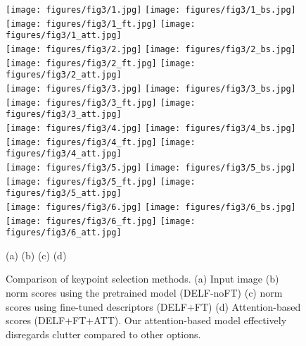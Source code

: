 \documentclass[10pt,twocolumn,letterpaper]{article}
\begin{document}
\begin{figure}[!h]
\vspace{0.1cm}
\begin{center}
\texttt{[image: figures/fig3/1.jpg]}
   \texttt{[image: figures/fig3/1\_bs.jpg]}
   \texttt{[image: figures/fig3/1\_ft.jpg]}
   \texttt{[image: figures/fig3/1\_att.jpg]}\\
	\vspace{0.05cm}
   \texttt{[image: figures/fig3/2.jpg]}
   \texttt{[image: figures/fig3/2\_bs.jpg]}
   \texttt{[image: figures/fig3/2\_ft.jpg]}
   \texttt{[image: figures/fig3/2\_att.jpg]}\\
	\vspace{0.05cm}
   \texttt{[image: figures/fig3/3.jpg]}
   \texttt{[image: figures/fig3/3\_bs.jpg]}
   \texttt{[image: figures/fig3/3\_ft.jpg]}
   \texttt{[image: figures/fig3/3\_att.jpg]}\\
	\vspace{0.05cm}
   \texttt{[image: figures/fig3/4.jpg]}
   \texttt{[image: figures/fig3/4\_bs.jpg]}
   \texttt{[image: figures/fig3/4\_ft.jpg]}
   \texttt{[image: figures/fig3/4\_att.jpg]}\\
	\vspace{0.05cm}
   \texttt{[image: figures/fig3/5.jpg]}
   \texttt{[image: figures/fig3/5\_bs.jpg]}
   \texttt{[image: figures/fig3/5\_ft.jpg]}
   \texttt{[image: figures/fig3/5\_att.jpg]}\\
	\vspace{0.05cm}
   \texttt{[image: figures/fig3/6.jpg]}
   \texttt{[image: figures/fig3/6\_bs.jpg]}
   \texttt{[image: figures/fig3/6\_ft.jpg]}
   \texttt{[image: figures/fig3/6\_att.jpg]}\\
	\vspace{-0.1cm}
\centerline{\footnotesize (a) \hspace{1.7cm} (b) \hspace{1.7cm} (c) \hspace{1.7cm} (d)}
	\vspace{-0.5cm}
\end{center}
	\caption{Comparison of keypoint selection methods. (a) Input image (b)  norm scores using the pretrained model (DELF-noFT) (c)  norm scores using fine-tuned descriptors (DELF+FT) (d) Attention-based scores (DELF+FT+ATT).  Our attention-based model effectively disregards clutter compared to other options.}
\label{fig:vis_att}
\vspace{-20pt}                                                                                                                                                                                                           
\end{figure}
\end{document}
